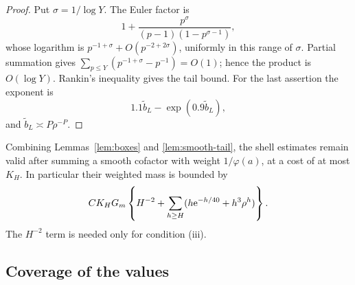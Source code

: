 \begin{proof}
Put \(\sigma=1/\log Y\).  The Euler factor is
\[
 1+\frac{p^\sigma}{(p-1)(1-p^{\sigma-1})},
\]
whose logarithm is \(p^{-1+\sigma}+O(p^{-2+2\sigma})\), uniformly
in this range of \(\sigma\).  Partial summation gives
\(\sum_{p\le Y}(p^{-1+\sigma}-p^{-1})=O(1)\); hence the product
is \(O(\log Y)\).  Rankin's inequality gives the tail bound.
For the last assertion the exponent is
\[
 1.1\widetilde b_L-\exp(0.9\widetilde b_L),
\]
and \(\widetilde b_L\asymp P\rho^{-P}\).
\end{proof}

Combining Lemmas~\ref{lem:boxes} and \ref{lem:smooth-tail}, the shell
estimates remain valid after summing a smooth cofactor with weight
\(1/\varphi(a)\), at a cost of at most \(K_H\).
In particular their weighted mass is bounded by
\begin{equation}\label{eq:weighted-boundary}
 C K_HG_m\left\{H^{-2}+
       \sum_{h\ge H}(h\mathrm e^{-h/40}+h^3\rho^h)\right\}.
\end{equation}
The \(H^{-2}\) term is needed only for condition (iii).

\subsection{Coverage of the values}

